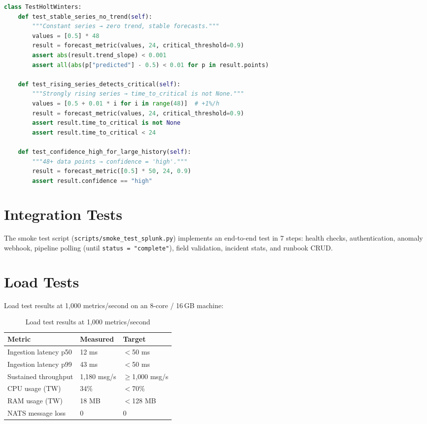 \begin{lstlisting}[language=Python, caption={Unit tests for the Holt-Winters engine}]
class TestHoltWinters:
    def test_stable_series_no_trend(self):
        """Constant series → zero trend, stable forecasts."""
        values = [0.5] * 48
        result = forecast_metric(values, 24, critical_threshold=0.9)
        assert abs(result.trend_slope) < 0.001
        assert all(abs(p["predicted"] - 0.5) < 0.01 for p in result.points)

    def test_rising_series_detects_critical(self):
        """Strongly rising series → time_to_critical is not None."""
        values = [0.5 + 0.01 * i for i in range(48)]  # +1%/h
        result = forecast_metric(values, 24, critical_threshold=0.9)
        assert result.time_to_critical is not None
        assert result.time_to_critical < 24

    def test_confidence_high_for_large_history(self):
        """48+ data points → confidence = 'high'."""
        result = forecast_metric([0.5] * 50, 24, 0.9)
        assert result.confidence == "high"
\end{lstlisting}

\section{Integration Tests}

The smoke test script (\texttt{scripts/smoke\_test\_splunk.py}) implements an
end-to-end test in 7 steps: health checks, authentication, anomaly webhook,
pipeline polling (until \texttt{status = "complete"}), field validation, incident
stats, and runbook CRUD.

\section{Load Tests}

Load test results at 1,000 metrics/second on an 8-core / 16\,GB machine:

\begin{table}[H]
\centering
\caption{Load test results at 1,000 metrics/second}
\label{tab:load-test}
\begin{tabularx}{\textwidth}{lXX}
\toprule
\textbf{Metric} & \textbf{Measured} & \textbf{Target} \\
\midrule
Ingestion latency p50  & 12 ms   & $<$50 ms \\
Ingestion latency p99  & 43 ms   & $<$50 ms \\
Sustained throughput   & 1,180 msg/s & $\geq$1,000 msg/s \\
CPU usage (TW)        & 34\%    & $<$70\% \\
RAM usage (TW)        & 18 MB   & $<$128 MB \\
NATS message loss     & 0       & 0 \\
\bottomrule
\end{tabularx}
\end{table}

